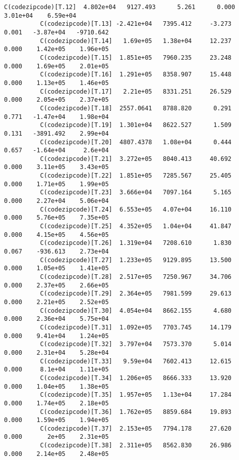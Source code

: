 \documentclass[11pt]{article}
\begin{document}
\begin{Verbatim}[commandchars=\\\{\}]
          C(codezipcode)[T.12]  4.802e+04   9127.493      5.261      0.000    3.01e+04    6.59e+04
          C(codezipcode)[T.13] -2.421e+04   7395.412     -3.273      0.001   -3.87e+04   -9710.642
          C(codezipcode)[T.14]   1.69e+05   1.38e+04     12.237      0.000    1.42e+05    1.96e+05
          C(codezipcode)[T.15]  1.851e+05   7960.235     23.248      0.000    1.69e+05    2.01e+05
          C(codezipcode)[T.16]  1.291e+05   8358.907     15.448      0.000    1.13e+05    1.46e+05
          C(codezipcode)[T.17]   2.21e+05   8331.251     26.529      0.000    2.05e+05    2.37e+05
          C(codezipcode)[T.18]  2557.0641   8788.820      0.291      0.771   -1.47e+04    1.98e+04
          C(codezipcode)[T.19]  1.301e+04   8622.527      1.509      0.131   -3891.492    2.99e+04
          C(codezipcode)[T.20]  4807.4378   1.08e+04      0.444      0.657   -1.64e+04     2.6e+04
          C(codezipcode)[T.21]  3.272e+05   8040.413     40.692      0.000    3.11e+05    3.43e+05
          C(codezipcode)[T.22]  1.851e+05   7285.567     25.405      0.000    1.71e+05    1.99e+05
          C(codezipcode)[T.23]  3.666e+04   7097.164      5.165      0.000    2.27e+04    5.06e+04
          C(codezipcode)[T.24]  6.553e+05   4.07e+04     16.110      0.000    5.76e+05    7.35e+05
          C(codezipcode)[T.25]  4.352e+05   1.04e+04     41.847      0.000    4.15e+05    4.56e+05
          C(codezipcode)[T.26]  1.319e+04   7208.610      1.830      0.067    -936.613    2.73e+04
          C(codezipcode)[T.27]  1.233e+05   9129.895     13.500      0.000    1.05e+05    1.41e+05
          C(codezipcode)[T.28]  2.517e+05   7250.967     34.706      0.000    2.37e+05    2.66e+05
          C(codezipcode)[T.29]  2.364e+05   7981.599     29.613      0.000    2.21e+05    2.52e+05
          C(codezipcode)[T.30]  4.054e+04   8662.155      4.680      0.000    2.36e+04    5.75e+04
          C(codezipcode)[T.31]  1.092e+05   7703.745     14.179      0.000    9.41e+04    1.24e+05
          C(codezipcode)[T.32]  3.797e+04   7573.370      5.014      0.000    2.31e+04    5.28e+04
          C(codezipcode)[T.33]   9.59e+04   7602.413     12.615      0.000     8.1e+04    1.11e+05
          C(codezipcode)[T.34]  1.206e+05   8666.333     13.920      0.000    1.04e+05    1.38e+05
          C(codezipcode)[T.35]  1.957e+05   1.13e+04     17.284      0.000    1.74e+05    2.18e+05
          C(codezipcode)[T.36]  1.762e+05   8859.684     19.893      0.000    1.59e+05    1.94e+05
          C(codezipcode)[T.37]  2.153e+05   7794.178     27.620      0.000       2e+05    2.31e+05
          C(codezipcode)[T.38]  2.311e+05   8562.830     26.986      0.000    2.14e+05    2.48e+05

\end{Verbatim}
\end{document}
